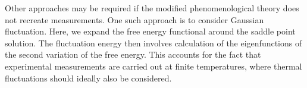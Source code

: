 

Other approaches may be required if the modified phenomenological
theory does not recreate measurements.
One such approach is to consider Gaussian fluctuation. Here, we expand
the free energy
functional around the saddle point solution. The fluctuation energy
then involves calculation of the eigenfunctions of the second variation
of the free energy. This accounts for the fact that experimental
measurements are carried out at finite temperatures, where thermal
fluctuations should ideally also be considered. 

